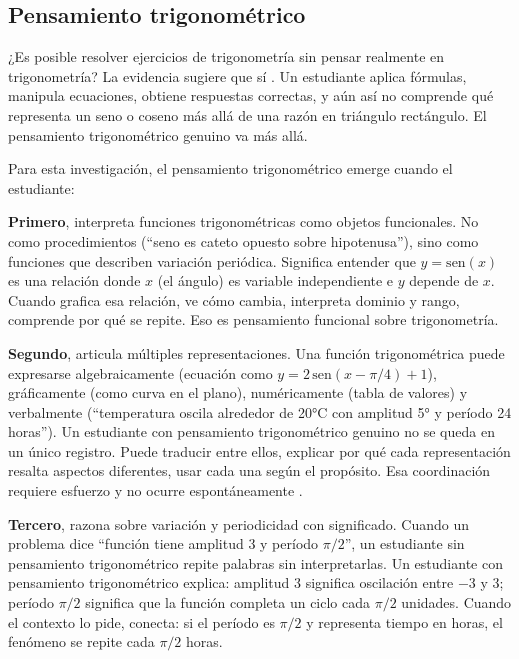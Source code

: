 \subsection{Pensamiento trigonométrico}

¿Es posible resolver ejercicios de trigonometría sin pensar realmente en trigonometría? La evidencia sugiere que sí \parencite{montiel-espinosaDesarrolloPensamientoTrigonometrico2013}. Un estudiante aplica fórmulas, manipula ecuaciones, obtiene respuestas correctas, y aún así no comprende qué representa un seno o coseno más allá de una razón en triángulo rectángulo. El pensamiento trigonométrico genuino va más allá.

Para esta investigación, el pensamiento trigonométrico emerge cuando el estudiante:

\textbf{Primero}, interpreta funciones trigonométricas como objetos funcionales. No como procedimientos (``seno es cateto opuesto sobre hipotenusa''), sino como funciones que describen variación periódica. Significa entender que $y = \mathrm{sen}(x)$ es una relación donde $x$ (el ángulo) es variable independiente e $y$ depende de $x$. Cuando grafica esa relación, ve cómo cambia, interpreta dominio y rango, comprende por qué se repite. Eso es pensamiento funcional sobre trigonometría.

\textbf{Segundo}, articula múltiples representaciones. Una función trigonométrica puede expresarse algebraicamente (ecuación como $y = 2\,\mathrm{sen}(x - \pi/4) + 1$), gráficamente (como curva en el plano), numéricamente (tabla de valores) y verbalmente (``temperatura oscila alrededor de 20°C con amplitud 5° y período 24 horas''). Un estudiante con pensamiento trigonométrico genuino no se queda en un único registro. Puede traducir entre ellos, explicar por qué cada representación resalta aspectos diferentes, usar cada una según el propósito. Esa coordinación requiere esfuerzo y no ocurre espontáneamente \parencite{duval2006}.

\textbf{Tercero}, razona sobre variación y periodicidad con significado. Cuando un problema dice ``función tiene amplitud 3 y período $\pi/2$'', un estudiante sin pensamiento trigonométrico repite palabras sin interpretarlas. Un estudiante con pensamiento trigonométrico explica: amplitud 3 significa oscilación entre $-3$ y $3$; período $\pi/2$ significa que la función completa un ciclo cada $\pi/2$ unidades. Cuando el contexto lo pide, conecta: si el período es $\pi/2$ y representa tiempo en horas, el fenómeno se repite cada $\pi/2$ horas.

